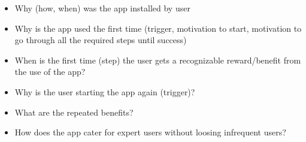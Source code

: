 \begin{breakbox}

\begin{itemize}
    \item Why (how, when) was the app
installed by user
\item Why is the app used the first time (trigger,
motivation to start, motivation to go through all the required steps
until success)
\item When is the first time (step) the user gets a
recognizable reward/benefit from the use of the app?
\end{itemize}

\end{breakbox}

\begin{breakbox}

\begin{itemize}
    \item Why is the user starting the
app again (trigger)?
\item  What are the repeated benefits?
\item How does the
app cater for expert users without loosing infrequent users?
\end{itemize}

\end{breakbox}

